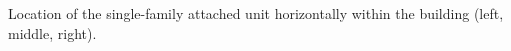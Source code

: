 Location of the single-family attached unit horizontally within the building (left, middle, right).

